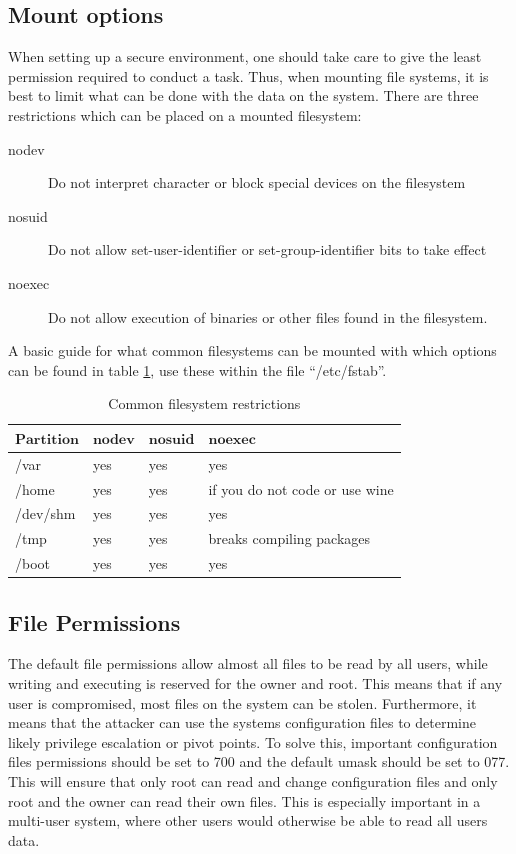 \documentclass[a4paper,11pt]{report}
\begin{document}
		\subsection{Mount options}
			When setting up a secure environment, one should take care to give the least permission required to conduct a task. 
			Thus, when mounting file systems, it is best to limit what can be done with the data on the system.
			There are three restrictions which can be placed on a mounted filesystem:
			\begin{description}
				\item[nodev] Do not interpret character or block special devices on the filesystem
				\item[nosuid] Do not allow set-user-identifier or set-group-identifier bits to take effect
				\item[noexec] Do not allow execution of binaries or other files found in the filesystem. 
			\end{description}
			A basic guide for what common filesystems can be mounted with which options can be found in table \ref{tab:mountOptions}, use these within the file ``/etc/fstab''.
			\begin{table}[htb]
				\centering
				\begin{tabular}{| l | l | l | l |}
					\hline
					$\textbf{Partition}$ & $\textbf{nodev}$ & $\textbf{nosuid}$ & $\textbf{noexec}$ \\ \hline
					/var  &		yes &	yes &	yes \\ \hline
					/home &		yes &	yes &	if you do not code or use wine \\ \hline
					/dev/shm &	yes &	yes &	yes \\ \hline
					/tmp &		yes &	yes &	breaks compiling packages \\ \hline
					/boot &		yes &	yes &	yes \\ \hline
				\end{tabular}
				\caption{Common filesystem restrictions}
				\label{tab:mountOptions}
			\end{table}
			\subsection{File Permissions}
				The default file permissions allow almost all files to be read by all users, while writing and executing is reserved for the owner and root. 
				This means that if any user is compromised, most files on the system can be stolen. 
				Furthermore, it means that the attacker can use the systems configuration files to determine likely privilege escalation or pivot points. 
				To solve this, important configuration files permissions should be set to 700 and the default umask should be set to 077. 
				This will ensure that only root can read and change configuration files and only root and the owner can read their own files. 
				This is especially important in a multi-user system, where other users would otherwise be able to read all users data. 
\end{document}
